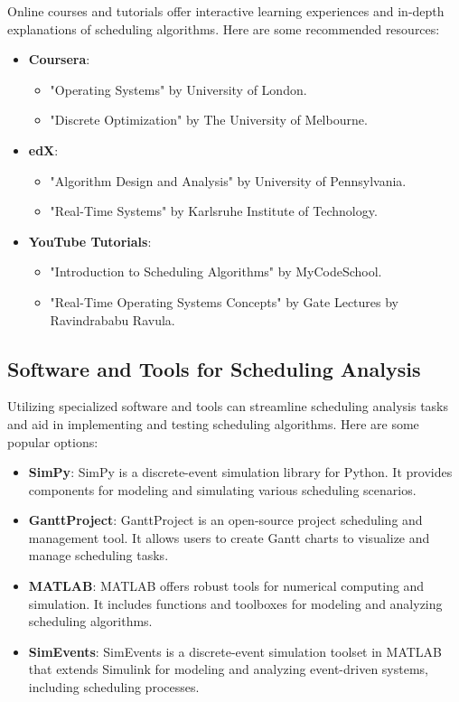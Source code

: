 \documentclass[12pt]{book} %
\begin{document}
Online courses and tutorials offer interactive learning experiences and in-depth explanations of scheduling algorithms. Here are some recommended resources:

\begin{itemize}
    \item \textbf{Coursera}:
    \begin{itemize}
        \item "Operating Systems" by University of London.
        \item "Discrete Optimization" by The University of Melbourne.
    \end{itemize}
    
    \item \textbf{edX}:
    \begin{itemize}
        \item "Algorithm Design and Analysis" by University of Pennsylvania.
        \item "Real-Time Systems" by Karlsruhe Institute of Technology.
    \end{itemize}
    
    \item \textbf{YouTube Tutorials}:
    \begin{itemize}
        \item "Introduction to Scheduling Algorithms" by MyCodeSchool.
        \item "Real-Time Operating Systems Concepts" by Gate Lectures by Ravindrababu Ravula.
    \end{itemize}
\end{itemize}

\subsection{Software and Tools for Scheduling Analysis}

Utilizing specialized software and tools can streamline scheduling analysis tasks and aid in implementing and testing scheduling algorithms. Here are some popular options:

\begin{itemize}
    \item \textbf{SimPy}: SimPy is a discrete-event simulation library for Python. It provides components for modeling and simulating various scheduling scenarios.
    
    \item \textbf{GanttProject}: GanttProject is an open-source project scheduling and management tool. It allows users to create Gantt charts to visualize and manage scheduling tasks.
    
    \item \textbf{MATLAB}: MATLAB offers robust tools for numerical computing and simulation. It includes functions and toolboxes for modeling and analyzing scheduling algorithms.
    
    \item \textbf{SimEvents}: SimEvents is a discrete-event simulation toolset in MATLAB that extends Simulink for modeling and analyzing event-driven systems, including scheduling processes.
\end{itemize}
\end{document}
